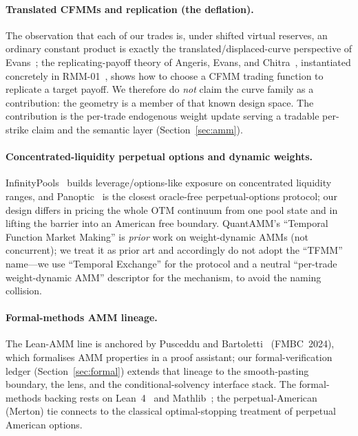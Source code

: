 \documentclass[11pt]{article}
\begin{document}
\paragraph{Translated CFMMs and replication (the deflation).}
The observation that each of our trades is, under shifted virtual reserves, an
ordinary constant product is exactly the translated/displaced-curve perspective of
Evans~\cite{evans2020}; the replicating-payoff theory of
Angeris, Evans, and Chitra~\cite{angeris-replicating}, instantiated concretely in
RMM-01~\cite{rmm01}, shows how to choose a CFMM trading function to replicate a
target payoff. We therefore do \emph{not} claim the curve family as a
contribution: the geometry is a member of that known design space. The
contribution is the per-trade endogenous weight update serving a tradable
per-strike claim and the semantic layer (Section~\ref{sec:amm}).

\paragraph{Concentrated-liquidity perpetual options and dynamic weights.}
InfinityPools~\cite{infinitypools} builds leverage/options-like exposure on
concentrated liquidity ranges, and Panoptic~\cite{panoptic} is the closest
oracle-free perpetual-options protocol; our design differs in pricing the whole
OTM continuum from one pool state and in lifting the barrier into an American free
boundary. QuantAMM's ``Temporal Function Market Making'' is \emph{prior} work on
weight-dynamic AMMs (not concurrent); we treat it as prior art and accordingly do
not adopt the ``TFMM'' name---we use ``Temporal Exchange'' for the protocol and a
neutral ``per-trade weight-dynamic AMM'' descriptor for the mechanism, to avoid
the naming collision.

\paragraph{Formal-methods AMM lineage.}
The Lean-AMM line is anchored by Pusceddu and
Bartoletti~\cite{pusceddu-bartoletti} (FMBC~2024), which formalises AMM
properties in a proof assistant; our formal-verification ledger
(Section~\ref{sec:formal}) extends that lineage to the smooth-pasting boundary,
the lens, and the conditional-solvency interface stack. The formal-methods backing
rests on Lean~4~\cite{lean4} and Mathlib~\cite{mathlib}; the perpetual-American
(Merton) tie connects to the classical optimal-stopping treatment of perpetual
American options.
\end{document}
